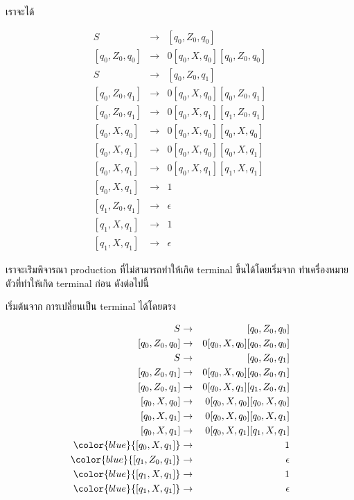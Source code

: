 {เราจะได้

\begin{eqnarray*}
S & \rightarrow & [q_0,Z_0, q_0] \\
\left[q_0, Z_0, q_0\right] & \rightarrow & 0 [ q_0, X, q_0][q_0, Z_0, q_0] \\
%
S & \rightarrow & [q_0,Z_0, q_1] \\
\left[q_0, Z_0, q_1\right] & \rightarrow & 0 [ q_0, X, q_0][q_0, Z_0, q_1] \\
\left[q_0, Z_0, q_1\right] & \rightarrow & 0 [ q_0, X, q_1][q_1, Z_0, q_1] \\
%
\left[q_0, X, q_0\right] & \rightarrow & 0[q_0, X, q_0][q_0, X, q_0] \\
\left[q_0, X, q_1\right] & \rightarrow & 0[q_0, X, q_0][q_0, X, q_1] \\
\left[q_0, X, q_1\right] & \rightarrow & 0[q_0, X, q_1][q_1, X, q_1] \\
%
\left[q_0, X, q_1\right] & \rightarrow & 1 \\
\left[q_1, Z_0, q_1\right] & \rightarrow & \epsilon \\
\left[q_1, X, q_1\right] & \rightarrow & 1 \\
\left[q_1, X, q_1\right] & \rightarrow & \epsilon
\end{eqnarray*}
}

\par{
เราจะเร่ิมพิจารณา production ที่ไม่สามารถทำให้เกิด terminal ขึ้นได้โดยเริ่มจาก ทำเครื่องหมายตัวที่ทำให้เกิด terminal ก่อน ดังต่อไปนี้
}

\par{
เริ่มต้นจาก การเปลี่ยนเป็น terminal ได้โดยตรง

\begin{eqnarray*}
S & \rightarrow & [q_0,Z_0, q_0] \\
\left[q_0, Z_0, q_0\right] & \rightarrow & 0 [ q_0, X, q_0][q_0, Z_0, q_0] \\
%
S & \rightarrow & [q_0,Z_0, q_1] \\
\left[q_0, Z_0, q_1\right] & \rightarrow & 0 [ q_0, X, q_0][q_0, Z_0, q_1] \\
\left[q_0, Z_0, q_1\right] & \rightarrow & 0 [ q_0, X, q_1][q_1, Z_0, q_1] \\
%
\left[q_0, X, q_0\right] & \rightarrow & 0[q_0, X, q_0][q_0, X, q_0] \\
\left[q_0, X, q_1\right] & \rightarrow & 0[q_0, X, q_0][q_0, X, q_1] \\
\left[q_0, X, q_1\right] & \rightarrow & 0[q_0, X, q_1][q_1, X, q_1] \\
%
\color{blue}{\left[q_0, X, q_1\right]} & \rightarrow & 1 \\
\color{blue}{\left[q_1, Z_0, q_1\right]} & \rightarrow & \epsilon \\
\color{blue}{\left[q_1, X, q_1\right]} & \rightarrow & 1 \\
\color{blue}{\left[q_1, X, q_1\right]} & \rightarrow & \epsilon
\end{eqnarray*}
}

